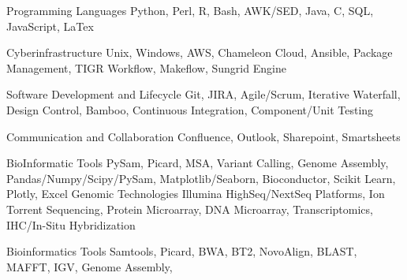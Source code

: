 

\begin{cvskills}

  \cvskill
    {Programming Languages} %
    {Python, Perl, R, Bash, AWK/SED, Java, C, SQL, JavaScript, LaTex} %

  \cvskill
    {Cyberinfrastructure} %
    {Unix, Windows, AWS, Chameleon Cloud, Ansible, Package Management, TIGR Workflow, Makeflow, Sungrid Engine} %

  \cvskill
    {Software Development and Lifecycle} %
    {Git, JIRA, Agile/Scrum, Iterative Waterfall, Design Control, Bamboo, Continuous Integration, Component/Unit Testing} %

    \cvskill
    {Communication and Collaboration}
    {Confluence, Outlook, Sharepoint, Smartsheets}

  \cvskill
    {BioInformatic Tools} %
    {PySam, Picard, MSA, Variant Calling, Genome Assembly, Pandas/Numpy/Scipy/PySam, Matplotlib/Seaborn, Bioconductor, Scikit Learn, Plotly, Excel} %
  \cvskill
    {Genomic Technologies} %
    {Illumina HighSeq/NextSeq Platforms, Ion Torrent Sequencing, Protein Microarray, DNA Microarray, Transcriptomics, IHC/In-Situ Hybridization} %

  \cvskill
    {Bioinformatics Tools} %
    {Samtools, Picard, BWA, BT2, NovoAlign, BLAST, MAFFT, IGV, Genome Assembly, } %




\end{cvskills}
